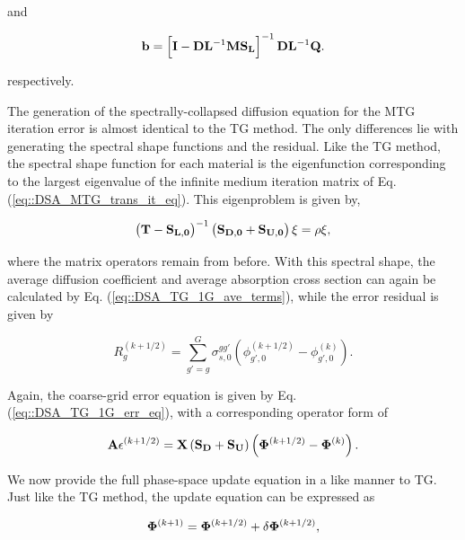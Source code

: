 \noindent and

\begin{equation}
\label{eq::DSA_MTG_half_it_forcingfunc}
{\bf b} = \left[ {\bf I} - {\bf D}{\bf L}^{-1} {\bf M} {\bf S_L} \right]^{-1} {\bf D}{\bf L}^{-1}  {\bf Q} .
\end{equation}

\noindent respectively. 

The generation of the spectrally-collapsed diffusion equation for the MTG iteration error is almost identical to the TG method. The only differences lie with generating the spectral shape functions and the residual. Like the TG method, the spectral shape function for each material is the eigenfunction corresponding to the largest eigenvalue of the infinite medium iteration matrix of Eq. (\ref{eq::DSA_MTG_trans_it_eq}). This eigenproblem is given by,

\begin{equation}
\label{eq::DSA_MTG_eigenpprob}
\left(  {\bf T} - {\bf S_{L,0}}  \right)^{-1} \left( {\bf S_{D,0}}+ {\bf S_{U,0}} \right)\xi = \rho \xi ,
\end{equation}

\noindent where the matrix operators remain from before. With this spectral shape, the average diffusion coefficient and average absorption cross section can again be calculated by Eq. (\ref{eq::DSA_TG_1G_ave_terms}), while the error residual is given by

\begin{equation}
\label{eq::DSA_MTG_diff_residual}
R_g^{(k+1/2)} = \sum_{g'=g}^G \sigma_{s,0}^{g g'} \left( \phi_{g',0}^{(k+1/2)} - \phi_{g',0}^{(k)} \right) .
\end{equation}

\noindent Again, the coarse-grid error equation is given by Eq. (\ref{eq::DSA_TG_1G_err_eq}), with a corresponding operator form of 

\begin{equation}
\label{eq::DSA_MTG_1G_err_eq_op}
{\bf A} \epsilon^{(k+1/2)}  =  {\bf X} \left( {\bf S_{D}} + {\bf S_{U}} \right) \left(  {\bf \Phi}^{(k+1/2)} - {\bf \Phi}^{(k)}  \right).
\end{equation}

We now provide the full phase-space update equation in a like manner to TG. Just like the TG method, the update equation can be expressed as 

\begin{equation}
\label{eq::DSA_MTG_update_op}
 {\bf \Phi}^{(k+1)} =  {\bf \Phi}^{(k+1/2)}  + \delta {\bf \Phi}^{(k+1/2)} ,
\end{equation}

